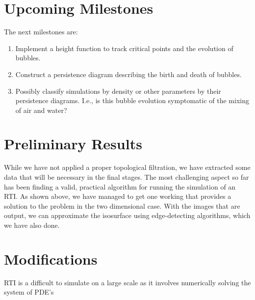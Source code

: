 \documentclass[12pt, fullpage,letterpaper]{article}
\begin{document}
	\section*{\normalfont Upcoming Milestones} The next milestones are:
	\begin{enumerate}
		\item Implement a height function to track critical points and the evolution of bubbles.
		\item Construct a persistence diagram describing the birth and death of bubbles.
		\item Possibly classify simulations by density or other parameters by their persistence diagrams. I.e., is this bubble evolution symptomatic of the mixing of air and water?
	\end{enumerate} 

	\section*{\normalfont Preliminary Results}
	While we have not applied a proper topological filtration, we have extracted some data that will be necessary in the final stages. The most challenging aspect so far has been finding a valid, practical algorithm for running the simulation of an RTI. As shown above, we have managed to get one working that provides a solution to the problem in the two dimensional case. With the images that are output, we can approximate the isosurface using edge-detecting algorithms, which we have also done.
	
	\section*{\normalfont Modifications} RTI is a difficult to simulate on a large scale as it involves numerically solving the system of PDE's
	
\end{document}
